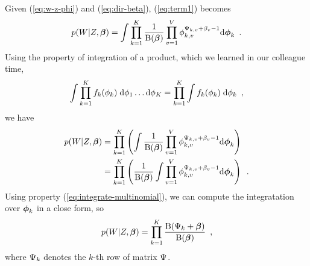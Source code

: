 Given (\ref{eq:w-z-phi}) and (\ref{eq:dir-beta}), (\ref{eq:term1})
becomes
\begin{equation}
  \label{eq:term-1-details}
  p(W|Z,\boldsymbol{\beta})
  =
  \int
  \prod_{k=1}^{K}
  \frac{1}{\operatorname{B}(\boldsymbol{\beta})}
  \prod_{v=1}^{V}
  \phi_{k,v}^{\Psi_{k,v} + \beta_{v} - 1}
  \mathrm{d} \boldsymbol{\phi}_{k}
  \enspace.
\end{equation}
Using the property of integration of a product, which we learned in
our colleague time,
\begin{equation}
  \label{eq:int-prod}
  \int \prod_{k=1}^K f_k(\phi_k) \; \mathrm{d}\phi_1 \ldots \mathrm{d}\phi_K
  =
  \prod_{k=1}^K
  \int f_k(\phi_k) \; \mathrm{d}\phi_k
  \enspace,
\end{equation}
we have
\begin{equation}
  \begin{split}
  \label{eq:term-1-details-more}
    p(W|Z,\boldsymbol{\beta})
    &=
    \prod_{k=1}^{K}  \left(
    \int
    \frac{1}{\operatorname{B}(\boldsymbol{\beta})}
    \prod_{v=1}^{V}
    \phi_{k,v}^{\Psi_{k,v} + \beta_{v} - 1}
    \mathrm{d} \boldsymbol{\phi}_{k}
    \right)
    \\
    &=
    \prod_{k=1}^{K}  \left(
    \frac{1}{\operatorname{B}(\boldsymbol{\beta})}
    \int
    \prod_{v=1}^{V}
    \phi_{k,v}^{\Psi_{k,v} + \beta_{v} - 1}
    \mathrm{d} \boldsymbol{\phi}_{k}
    \right)
    \enspace.
  \end{split}
\end{equation}
Using property (\ref{eq:integrate-multinomial}), we can compute the
integratation over $\boldsymbol{\phi}_{k}$ in a close form, so
\begin{equation}
  \label{eq:term1-final}
  p(W|Z,\boldsymbol{\beta})
  =
  \prod_{k=1}^{K}
  \frac{\operatorname{B}(\Psi_{k}+\boldsymbol{\beta})}{\operatorname{B}(\boldsymbol{\beta})}
  \enspace,
\end{equation}
where $\Psi_{k}$ denotes the $k$-th row of matrix $\Psi_{}$.


